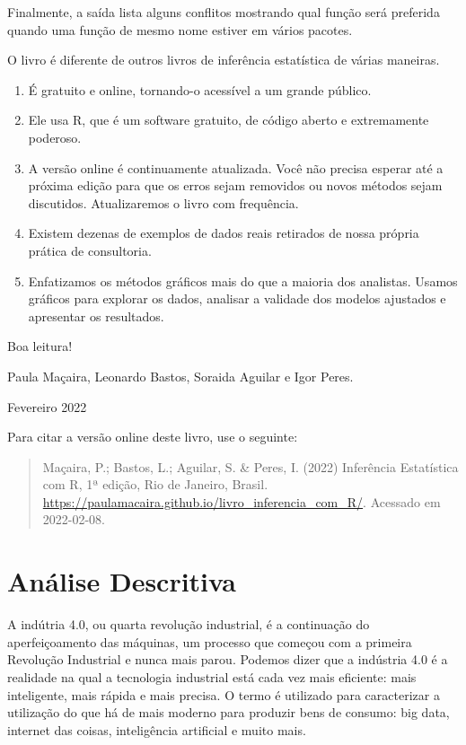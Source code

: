 \documentclass[
]{book}
\providecommand{\tightlist}{%
  \setlength{\itemsep}{0pt}\setlength{\parskip}{0pt}}
\begin{document}
Finalmente, a saída lista alguns conflitos mostrando qual função será preferida quando uma função de mesmo nome estiver em vários pacotes.

O livro é diferente de outros livros de inferência estatística de várias maneiras.

\begin{enumerate}
\def\labelenumi{\arabic{enumi}.}
\tightlist
\item
  É gratuito e online, tornando-o acessível a um grande público.
\item
  Ele usa R, que é um software gratuito, de código aberto e extremamente poderoso.
\item
  A versão online é continuamente atualizada. Você não precisa esperar até a próxima edição para que os erros sejam removidos ou novos métodos sejam discutidos. Atualizaremos o livro com frequência.
\item
  Existem dezenas de exemplos de dados reais retirados de nossa própria prática de consultoria.
\item
  Enfatizamos os métodos gráficos mais do que a maioria dos analistas. Usamos gráficos para explorar os dados, analisar a validade dos modelos ajustados e apresentar os resultados.
\end{enumerate}

Boa leitura!

Paula Maçaira, Leonardo Bastos, Soraida Aguilar e Igor Peres.

Fevereiro 2022

Para citar a versão online deste livro, use o seguinte:

\begin{quote}
Maçaira, P.; Bastos, L.; Aguilar, S. \& Peres, I. (2022) Inferência Estatística com R, 1ª edição, Rio de Janeiro, Brasil. \url{https://paulamacaira.github.io/livro_inferencia_com_R/}. Acessado em 2022-02-08.
\end{quote}

\hypertarget{analise_descritiva}{%
\chapter{Análise Descritiva}\label{analise_descritiva}}

A indútria 4.0, ou quarta revolução industrial, é a continuação do aperfeiçoamento das máquinas, um processo que começou com a primeira Revolução Industrial e nunca mais parou. Podemos dizer que a indústria 4.0 é a realidade na qual a tecnologia industrial está cada vez mais eficiente: mais inteligente, mais rápida e mais precisa. O termo é utilizado para caracterizar a utilização do que há de mais moderno para produzir bens de consumo: big data, internet das coisas, inteligência artificial e muito mais.
\end{document}
